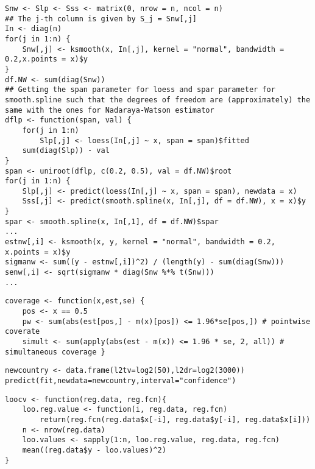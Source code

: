 \vspace{-14pt}

\begin{lstlisting}[style=RStyle, caption={Hat Matrix},numbers=none]
Snw <- Slp <- Sss <- matrix(0, nrow = n, ncol = n)
## The j-th column is given by S_j = Snw[,j]
In <- diag(n)
for(j in 1:n) {
    Snw[,j] <- ksmooth(x, In[,j], kernel = "normal", bandwidth = 0.2,x.points = x)$y
}
df.NW <- sum(diag(Snw))
## Getting the span parameter for loess and spar parameter for smooth.spline such that the degrees of freedom are (approximately) the same with the ones for Nadaraya-Watson estimator
dflp <- function(span, val) {
    for(j in 1:n)
        Slp[,j] <- loess(In[,j] ~ x, span = span)$fitted
    sum(diag(Slp)) - val
}
span <- uniroot(dflp, c(0.2, 0.5), val = df.NW)$root
for(j in 1:n) {
    Slp[,j] <- predict(loess(In[,j] ~ x, span = span), newdata = x)
    Sss[,j] <- predict(smooth.spline(x, In[,j], df = df.NW), x = x)$y
}
spar <- smooth.spline(x, In[,1], df = df.NW)$spar
...
estnw[,i] <- ksmooth(x, y, kernel = "normal", bandwidth = 0.2, x.points = x)$y
sigmanw <- sum((y - estnw[,i])^2) / (length(y) - sum(diag(Snw)))
senw[,i] <- sqrt(sigmanw * diag(Snw %*% t(Snw)))
...
\end{lstlisting}

\vspace{-14pt}

\begin{lstlisting}[style=RStyle, caption={Coverage Function},numbers=none]
coverage <- function(x,est,se) {
    pos <- x == 0.5
    pw <- sum(abs(est[pos,] - m(x)[pos]) <= 1.96*se[pos,]) # pointwise coverate
    simult <- sum(apply(abs(est - m(x)) <= 1.96 * se, 2, all)) # simultaneous coverage }
\end{lstlisting}

\vspace{-14pt}

\begin{lstlisting}[style=RStyle, caption={Confidence Intervals},numbers=none]
newcountry <- data.frame(l2tv=log2(50),l2dr=log2(3000))
predict(fit,newdata=newcountry,interval="confidence")
\end{lstlisting}

\vspace{-14pt}

\begin{lstlisting}[style=RStyle, caption={LOOCV},numbers=none]
loocv <- function(reg.data, reg.fcn){
    loo.reg.value <- function(i, reg.data, reg.fcn)
        return(reg.fcn(reg.data$x[-i], reg.data$y[-i], reg.data$x[i]))
    n <- nrow(reg.data)
    loo.values <- sapply(1:n, loo.reg.value, reg.data, reg.fcn)
    mean((reg.data$y - loo.values)^2)
}
\end{lstlisting}

